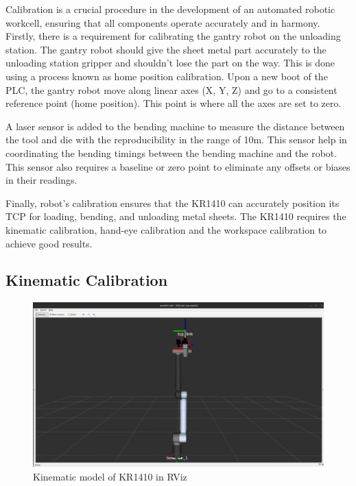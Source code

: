 
Calibration is a crucial procedure in the development of 
an automated robotic workcell, ensuring that all components
operate accurately and in harmony. Firstly, there is a requirement for calibrating the gantry robot on the unloading station. The gantry robot should give the sheet metal part accurately to the unloading station gripper and shouldn't lose the part on the way. This is done using a process known as home position calibration. Upon a new boot of the PLC, the gantry robot move along linear axes (X, Y, Z) and go to a consistent reference point (home position). This point is where all the axes are set to zero.

A laser sensor is added to the bending machine to measure the distance between the tool and die with the reproducibility in the range of 10\textmu m. This sensor help in coordinating the bending timings between the bending machine and the robot. This sensor also requires a baseline or zero point to eliminate any offsets or biases in their readings.

Finally, robot's calibration ensures that the KR1410 can accurately position its TCP for loading, bending, and unloading metal sheets. The KR1410 requires the kinematic calibration, hand-eye calibration and the workspace calibration to achieve good results.

\subsection{Kinematic Calibration}
\label{subsec:kinematic-calibration}

\begin{figure}[h]
    \centering
    \includegraphics[width=1\textwidth]{6. System Integration and Testing/6.2 Calibration Procedures/tcp.PNG}
    \caption{Kinematic model of KR1410 in RViz}
    \label{fig:tcp}
\end{figure}


